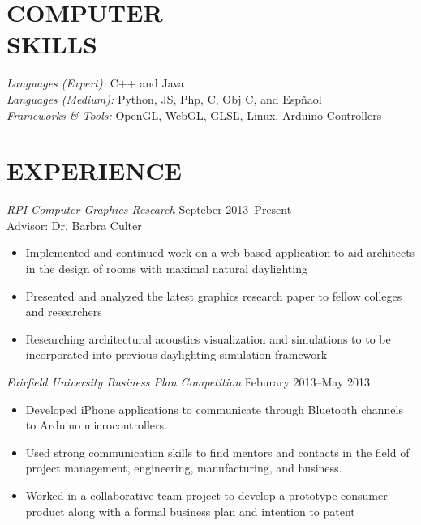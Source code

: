 \documentclass[margin, 10pt]{res}
\begin{document}
\begin{resume}
\section{COMPUTER \\ SKILLS} 

{\sl Languages (Expert):}  C++ and Java \\
{\sl Languages (Medium):} Python, JS, Php, C, 
Obj C, and Esp\~naol  \\
{\sl Frameworks \& Tools:} OpenGL, WebGL, GLSL, Linux, Arduino Controllers
 
%
%  
 
\section{EXPERIENCE}

{\sl RPI Computer Graphics Research} \hfill Septeber 2013--Present\\
Advisor: Dr. Barbra Culter
\begin{itemize} \itemsep -2.5pt %
\item Implemented and continued work on a web based application to aid 
      architects in the design of rooms with maximal natural daylighting
\item Presented and analyzed the latest graphics research paper to fellow 
      colleges and researchers
\item Researching architectural acoustics visualization and simulations to
      to be incorporated into previous daylighting simulation framework
\end{itemize}
 
{\sl Fairfield University Business Plan Competition} 
                                              \hfill Feburary 2013--May 2013
\begin{itemize} \itemsep -2.5pt %
\item Developed iPhone applications to communicate through Bluetooth 
      channels to Arduino microcontrollers.
\item Used strong communication skills to find mentors and contacts in the 
      field of project management, engineering, manufacturing, and business.
\item Worked in a collaborative team project to develop a prototype consumer
      product along with a formal business plan and intention to patent
\end{itemize}
 

\end{resume}
\end{document}
